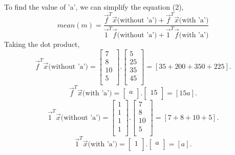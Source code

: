 \documentclass[12pt, a4paper, twocolumn]{article}
\begin{document}
To find the value of 'a', we can simplify the equation (2),
\begin{equation*}
		mean(m) = \frac{\vec{f}^T\vec{x}\text{(without 'a')} + \vec{f}^T\vec{x}\text{(with 'a')}}{\vec{1}^T\vec{f}\text{(without 'a')} + \vec{1}^T\vec{f}\text{(with 'a')}}
\end{equation*}
Taking the dot product,\\
\begin{equation*}
	\vec{f}^T\vec{x}\text{(without 'a')} = \begin{bmatrix} 7\\8\\10\\5\\
		\end{bmatrix}.\begin{bmatrix} 	5\\25\\35\\45\\
		\end{bmatrix} = [35 + 200 + 350 + 225].
\end{equation*}
\begin{equation*}
	\vec{f}^T\vec{x}\text{(with 'a')} = \begin{bmatrix} a\\
	\end{bmatrix}.\begin{bmatrix} 	15\\
	\end{bmatrix} = [15a].
\end{equation*}
\begin{equation*}
	\vec{1}^T\vec{x}\text{(without 'a')} = \begin{bmatrix} 1\\1\\1\\1\\
	\end{bmatrix}.\begin{bmatrix} 	7\\8\\10\\5\\
	\end{bmatrix} = [7 + 8 + 10 + 5].
\end{equation*}
\begin{equation*}
	\vec{1}^T\vec{x}\text{(with 'a')} = \begin{bmatrix} 1\\
	\end{bmatrix}.\begin{bmatrix} 	a\\
	\end{bmatrix} = [a].
\end{equation*}
\end{document}
